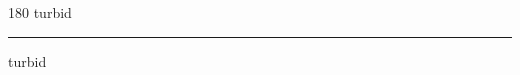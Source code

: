 
\begin{frame}
\begin{center}
\begin{turn}{180}
{\fontsize{2.5cm}{1em}\selectfont turbid}
\end{turn}
\vspace{1em}\par  
\hrule
\vspace{1em}\par  
{\fontsize{2.5cm}{1em}\selectfont turbid}
\end{center}
\end{frame}
